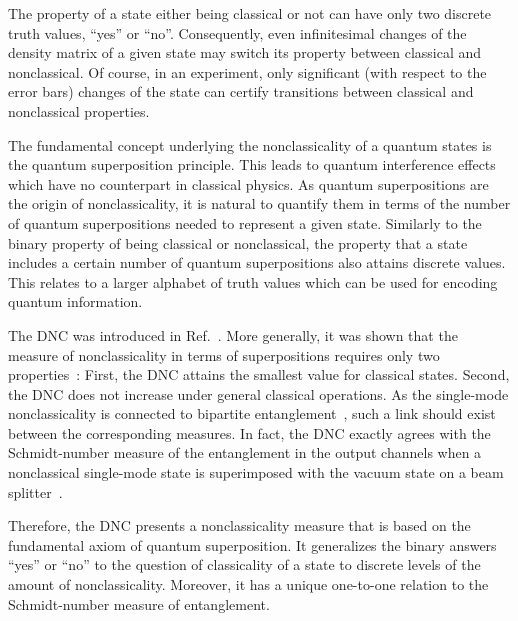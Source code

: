 \documentclass[aps,pra,twocolumn,showpacs,superscriptaddress,10pt]{revtex4-1}
\begin{document}
	The property of a state either being classical or not can have only two discrete truth values, ``yes'' or ``no''.
	Consequently, even infinitesimal changes of the density matrix of a given state may switch its property between classical and nonclassical.
	Of course, in an experiment, only significant (with respect to the error bars) changes of the state can certify transitions between classical and nonclassical properties.

	The fundamental concept underlying the nonclassicality of a quantum states is the quantum superposition principle.
	This leads to quantum interference effects which have no counterpart in classical physics.
	As quantum superpositions are the origin of nonclassicality, it is natural to quantify them in terms of the number of quantum superpositions needed to represent a given state.
	Similarly to the binary property of being classical or nonclassical, the property that a state includes a certain number of quantum superpositions also attains discrete values.
	This relates to a larger alphabet of truth values which can be used for encoding quantum information.

	The DNC was introduced in Ref.~\cite{Gehrke2012}.
	More generally, it was shown that the measure of nonclassicality in terms of superpositions requires only two properties~\cite{Sperling2015}:
	First, the DNC attains the smallest value for classical states.
	Second, the DNC does not increase under general classical operations.
	As the single-mode nonclassicality is connected to bipartite entanglement~\cite{Aharonov1966,Kim2002,Wang2002}, such a link should exist between the corresponding measures.
	In fact, the DNC exactly agrees with the Schmidt-number measure of the entanglement in the output channels when a nonclassical single-mode state is superimposed with the vacuum state on a beam splitter~\cite{Vogel2014}.

	Therefore, the DNC presents a nonclassicality measure that is based on the fundamental axiom of quantum superposition.
	It generalizes the binary answers ``yes'' or ``no'' to the question of classicality of a state to discrete levels of the amount of nonclassicality.
	Moreover, it has a unique one-to-one relation to the Schmidt-number measure of entanglement.
\end{document}
